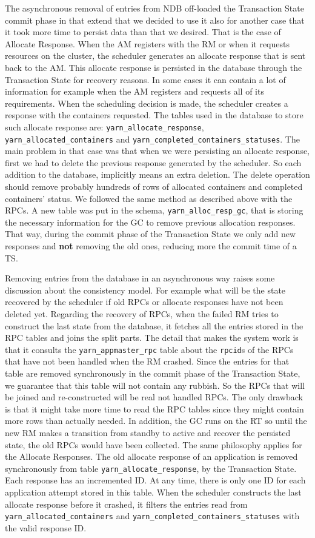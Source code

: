 The asynchronous removal of entries from NDB off-loaded the Transaction
State commit phase in that extend that we decided to use it also for
another case that it took more time to persist data than that we
desired. That is the case of Allocate Response. When the AM registers
with the RM or when it requests resources on the cluster, the
scheduler generates an allocate response that is sent back to the
AM. This allocate response is persisted in the database through the
Transaction State for recovery reasons. In some cases it can contain a
lot of information for example when the AM registers and requests all
of its requirements. When the scheduling decision is made, the scheduler creates a response with the
containers requested. The tables used in the database to store such
allocate response are: \texttt{yarn\_allocate\_response},
\texttt{yarn\_allocated\_containers} and
\texttt{yarn\_completed\_containers\_statuses}. The main problem in
that case was that when we were persisting an allocate response, first we
had to delete the previous response generated by the
scheduler. So each addition to the database, implicitly means an extra
deletion. The delete operation should remove probably hundreds of
rows of allocated containers and completed containers' status. We
followed the same method as described above with the RPCs. A new table
was put in the schema, \texttt{yarn\_alloc\_resp\_gc}, that is
storing the necessary information for the GC to remove previous
allocation responses. That way, during the commit phase of the
Transaction State we only add new responses and \textbf{not} removing
the old ones, reducing more the commit time of a TS.

Removing entries from the database in an asynchronous way raises some
discussion about the consistency model. For example what will be the
state recovered by the scheduler if old RPCs or allocate responses
have not been deleted yet. Regarding the recovery of RPCs, when the
failed RM tries to construct the last state from the database, it
fetches all the entries stored in the RPC tables and joins the split
parts. The detail that makes the system work is that it consults the
\texttt{yarn\_appmaster\_rpc} table about the \texttt{rpcid}s of the
RPCs that have not been handled when the RM crashed. Since the entries
for that table are removed synchronously in the commit phase of the
Transaction State, we guarantee that this table will not contain any
rubbish. So the RPCs that will be joined and re-constructed will be
real not handled RPCs. The only drawback is that it might take more
time to read the RPC tables since they might contain more rows than
actually needed. In addition, the GC runs on the RT so until the new
RM makes a transition from standby to active and recover the persisted
state, the old RPCs would have been collected. The same philosophy
applies for the Allocate Responses. The old allocate response of an
application is removed synchronously from table
\texttt{yarn\_allocate\_response}, by the Transaction State. Each
response has an incremented ID. At any time, there is only one ID for
each application attempt stored in this table. When the scheduler
constructs the last allocate response before it crashed, it filters
the entries read from \texttt{yarn\_allocated\_containers} and
\texttt{yarn\_completed\_containers\_statuses} with the valid response ID.
